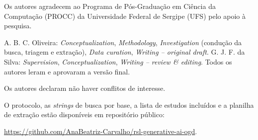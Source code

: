 \documentclass[brazilian]{sbc2025}
\newif\ifanon
\begin{document}
\begin{declarations}

\ifanon
\begin{acknowledgements}
Agradecimentos serão incluídos na versão camera-ready.
\end{acknowledgements}
\else
\begin{acknowledgements}
Os autores agradecem ao Programa de Pós-Graduação em Ciência da Computação
(PROCC) da Universidade Federal de Sergipe (UFS) pelo apoio à pesquisa.
\end{acknowledgements}
\fi

\begin{contributions}
\ifanon
Autor~1: \textit{Conceptualization}, \textit{Methodology}, \textit{Investigation}
(condução da busca, triagem e extração), \textit{Data curation},
\textit{Writing -- original draft}. Autor~2: \textit{Supervision},
\textit{Conceptualization}, \textit{Writing -- review \& editing}. Todos os
autores leram e aprovaram a versão final.
\else
A. B. C. Oliveira: \textit{Conceptualization}, \textit{Methodology},
\textit{Investigation} (condução da busca, triagem e extração),
\textit{Data curation}, \textit{Writing -- original draft}.
G. J. F. da Silva: \textit{Supervision}, \textit{Conceptualization},
\textit{Writing -- review \& editing}. Todos os autores leram e aprovaram a
versão final.
\fi
\end{contributions}

\begin{interests}
Os autores declaram não haver conflitos de interesse.
\end{interests}

\begin{materials}
O protocolo, as \textit{strings} de busca por base, a lista de estudos
incluídos e a planilha de extração estão disponíveis em repositório público:
\ifanon
\url{https://anonymous.4open.science/r/anon-supp-materials-2026-BD9F}
(espelho anônimo para a revisão; o repositório identificado será divulgado
na versão camera-ready).
\else
\url{https://github.com/AnaBeatriz-Carvalho/rsl-generative-ai-ogd}.
\fi
\end{materials}


\end{declarations}
\end{document}
